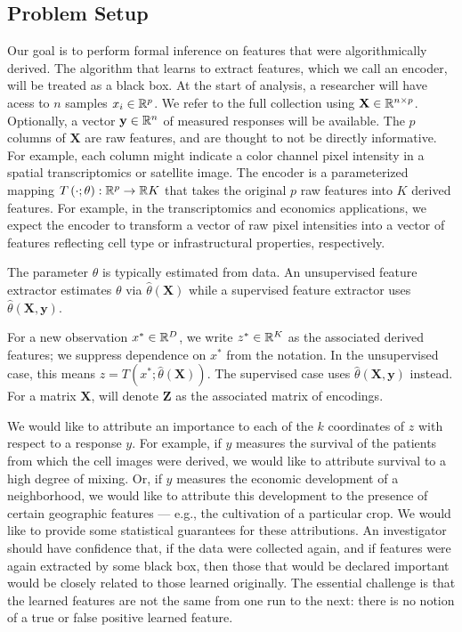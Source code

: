 \subsection{Problem Setup}

Our goal is to perform formal inference on features that were algorithmically derived. The algorithm that learns to extract features, which we call an encoder, will be treated as a black box. At the start of analysis, a researcher will have acess to $n$ samples $x_i \in \mathbb{R}^{p}$. We refer to the full collection using $\mathbf{X} \in \mathbb{R}^{n \times p}$. Optionally, a vector $\mathbf{y}\in \mathbb{R}^{n}$ of measured responses will be available. The $p$ columns of $\mathbf{X}$ are raw features, and are thought to not be directly informative. For example, each column might indicate a color channel pixel intensity in a spatial transcriptomics or satellite image. The encoder is a parameterized mapping $T\left(\cdot; \theta\right): \mathbb{R}^{p} \to \mathbb{R}{K}$ that takes the original $p$ raw features into $K$ derived features. For example, in the transcriptomics and economics applications, we expect the encoder to transform a vector of raw pixel intensities into a vector of features reflecting cell type or infrastructural properties, respectively.

The parameter $\theta$ is typically estimated from data. An unsupervised feature extractor estimates $\theta$ via $\hat{\theta}\left(\mathbf{X}\right)$ while a supervised feature extractor uses $\hat{\theta}\left(\mathbf{X}, \mathbf{y}\right)$. 

For a new observation $x^{\ast}\in \mathbb{R}^{D}$, we write $z^{\ast} \in
\mathbb{R}^{K}$ as the associated derived features; we suppress dependence on
$x^{\ast}$ from the notation. In the unsupervised case, this means $z =
T\left(x^{\ast}; \hat{\theta}\left(\mathbf{X}\right)\right)$. The supervised
case uses $\hat{\theta}\left(\mathbf{X}, \mathbf{y}\right)$ instead. For
a matrix $\mathbf{X}$, will denote $\mathbf{Z}$ as the associated matrix of
encodings.

We would like to attribute an importance to each of the $k$ coordinates of $z$ with respect to a response $y$. For example, if $y$ measures the survival of the patients from which the cell images were derived, we would like to attribute survival to a high degree of mixing. Or, if $y$ measures the economic development of a neighborhood, we would like to attribute this development to the presence of certain geographic features — e.g., the cultivation of a particular crop.
We would like to provide some statistical guarantees for these attributions. An investigator should have confidence that, if the data were collected again, and if features were again extracted by some black box, then those that would be declared important would be closely related to those learned originally. The essential challenge is that the learned features are not the same from one run to the next: there is no notion of a true or false positive learned feature.


